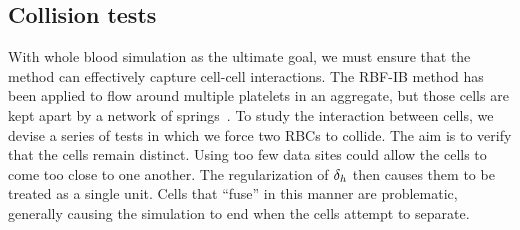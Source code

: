 \subsection{Collision tests}

With whole blood simulation as the ultimate goal, we must ensure that the method can effectively capture cell-cell
interactions. The RBF-IB method has been applied to flow around multiple platelets in an aggregate, but those
cells are kept apart by a network of springs~\cite{Shankar:2015km}. To study the interaction between cells, we
devise a series of tests in which we force two RBCs to collide. The aim is to verify that the cells remain
distinct. Using too few data sites could allow the cells to come too close to one another. The regularization of
$\delta_h$ then causes them to be treated as a single unit. Cells that ``fuse'' in this manner are problematic,
generally causing the simulation to end when the cells attempt to separate.

